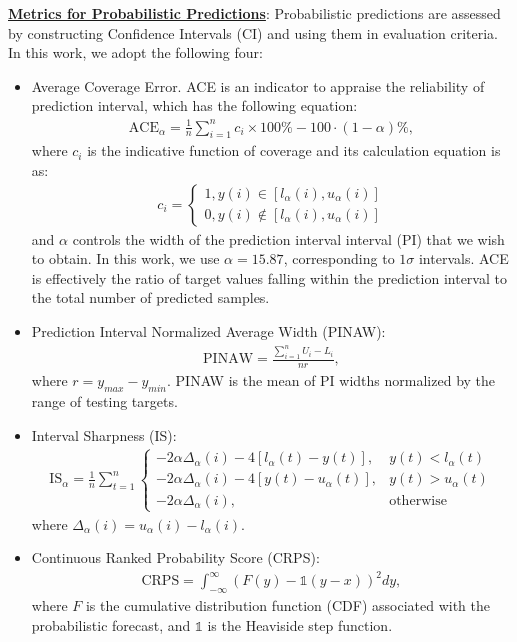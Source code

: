 \textbf{\underline{Metrics for Probabilistic Predictions}}: Probabilistic predictions are assessed by constructing Confidence Intervals (CI) and using them in evaluation criteria. In this work, we adopt the following four:
\begin{itemize}
    \item Average Coverage Error. ACE is an indicator to appraise the reliability of prediction interval, which has the following equation:
    \begin{align}
        \mathrm{ACE}_{\alpha}=\frac{1}{n} \sum_{i=1}^{n} c_{i} \times 100 \%-100 \cdot(1-\alpha) \%,
    \end{align}
    where $c_i$ is the indicative function of coverage and its calculation equation is as:
    \begin{align}
        c_{i}=\left\{\begin{array}{l}
1, y(i) \in\left[l_{\alpha}(i), u_{\alpha}(i)\right] \\
0, y(i) \notin\left[l_{\alpha}(i), u_{\alpha}(i)\right]
\end{array}\right.
    \end{align}
    and $\alpha$ controls the width of the prediction interval interval (PI) that we wish to obtain. In this work, we use $\alpha = 15.87$, corresponding to $1\sigma$ intervals. ACE is effectively the ratio of target values falling within the prediction interval to the total number of predicted samples.
    \item Prediction Interval Normalized Average Width (PINAW):
    \begin{align}
        \mathrm{PINAW} = \frac{\sum_{i=1}^n U_i - L_i}{nr},
    \end{align}
    where $r = y_{max} - y_{min}$. PINAW is the mean of PI widths normalized by the range of testing targets. %
    \item Interval Sharpness (IS):
    \begin{align}
        \mathrm{IS}_{\alpha}=\frac{1}{n} \sum_{t=1}^{n}\left\{\begin{array}{ll}
-2 \alpha\Delta_{\alpha}(i)-4\left[l_{\alpha}(t)-y(t)\right], & y(t)<l_{\alpha}(t) \\
-2 \alpha\Delta_{\alpha}(i)-4\left[y(t)-u_{\alpha}(t)\right], & y(t)>u_{\alpha}(t) \\
-2 \alpha\Delta_{\alpha}(i), & \mathrm{otherwise}\end{array}\right.
    \end{align}
    where $\Delta_{\alpha}(i) = u_{\alpha}(i)-l_{\alpha}(i)$. 
    \item Continuous Ranked Probability Score (CRPS):
    \begin{align}
        \mathrm{CRPS}=\int_{-\infty}^{\infty}(F(y)-\mathbb{1}(y-x))^{2} d y,
    \end{align}
    where $F$ is the cumulative distribution function (CDF) associated with the probabilistic forecast, and $\mathbb{1}$ is the Heaviside step function.
\end{itemize}

